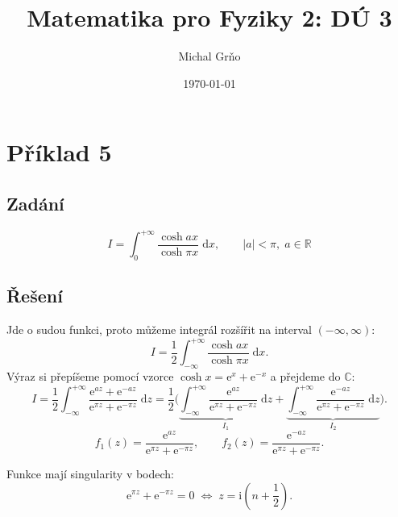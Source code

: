 \documentclass[10pt,a4paper]{article}
\newcommand{\const}[1]{\text{#1}}
\renewcommand{\d}[1]{\;\const{d}#1}
\newcommand{\e}[1]{\const{e}^{#1}}
\renewcommand{\i}{\const{i}}
\begin{document}
\title{Matematika pro Fyziky 2: DÚ 3}
\author{Michal Grňo}
\date{\today}

\maketitle

\section{Příklad 5}
\subsection{Zadání} \label{U5:zadanie}
\begin{equation*}
    I = \int_0^{+\infty}\frac{\cosh ax}{\cosh \pi x} \d{x},
    \hspace{2em}
    |a|<\pi, \; a \in \mathbb{R}
\end{equation*}

\subsection{Řešení}
Jde o sudou funkci, proto můžeme integrál rozšířit na interval $(-\infty, \infty)$:
\begin{equation*}
    I = \frac{1}{2} \int_{-\infty}^{+\infty}\frac{\cosh ax}{\cosh \pi x} \d{x}.
\end{equation*}
Výraz si přepíšeme pomocí vzorce $\cosh x = \e{x} + \e{-x}$ a přejdeme do $\mathbb{C}$:
\begin{equation*}
    I = \frac{1}{2} \int_{-\infty}^{+\infty}\frac{\e{az} + \e{-az}}{\e{\pi z} + \e{-\pi z}} \d{z}
    = \frac{1}{2} \Big( \underbrace{\int_{-\infty}^{+\infty}\frac{\e{az}}{\e{\pi z} + \e{-\pi z}} \d{z}}_{I_1} + \underbrace{\int_{-\infty}^{+\infty}\frac{\e{-az}}{\e{\pi z} + \e{-\pi z}} \d{z}}_{I_2} \Big).
\end{equation*}
\begin{equation*}
    f_1(z) = \frac{\e{az}}{\e{\pi z} + \e{-\pi z}},
    \hspace{2em}
    f_2(z) = \frac{\e{-az}}{\e{\pi z} + \e{-\pi z}}.
\end{equation*}

Funkce mají singularity v bodech:
\begin{equation*}
    \e{\pi z} + \e{-\pi z} = 0 \; \Leftrightarrow \; z = \i (n + \frac{1}{2}).
\end{equation*}
\end{document}
